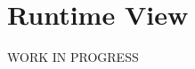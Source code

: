 \documentclass[../../DD.tex]{subfiles}
\begin{document}
\section{Runtime View\label{sect:2.4}}
	WORK IN PROGRESS
	
\end{document}
